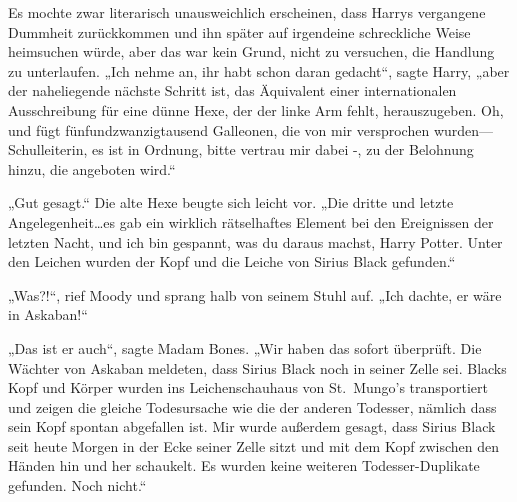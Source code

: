 Es mochte zwar literarisch unausweichlich erscheinen, dass Harrys vergangene Dummheit zurückkommen und ihn später auf irgendeine schreckliche Weise heimsuchen würde, aber das war kein Grund, nicht zu versuchen, die Handlung zu unterlaufen.
„Ich nehme an, ihr habt schon daran gedacht“, sagte Harry, „aber der naheliegende nächste Schritt ist, das Äquivalent einer internationalen Ausschreibung für eine dünne Hexe, der der linke Arm fehlt, herauszugeben. Oh, und fügt fünfundzwanzigtausend Galleonen, die von mir versprochen wurden—Schulleiterin, es ist in Ordnung, bitte vertrau mir dabei -, zu der Belohnung hinzu, die angeboten wird.“

„Gut gesagt.“
Die alte Hexe beugte sich leicht vor.
„Die dritte und letzte Angelegenheit…es gab ein wirklich rätselhaftes Element bei den Ereignissen der letzten Nacht, und ich bin gespannt, was du daraus machst, Harry Potter. Unter den Leichen wurden der Kopf und die Leiche von Sirius Black gefunden.“

„Was?!“, rief Moody und sprang halb von seinem Stuhl auf. „Ich dachte, er wäre in Askaban!“

„Das ist er auch“, sagte Madam Bones. „Wir haben das sofort überprüft. Die Wächter von Askaban meldeten, dass Sirius Black noch in seiner Zelle sei. Blacks Kopf und Körper wurden ins Leichenschauhaus von St.~Mungo’s transportiert und zeigen die gleiche Todesursache wie die der anderen Todesser, nämlich dass sein Kopf spontan abgefallen ist. Mir wurde außerdem gesagt, dass Sirius Black seit heute Morgen in der Ecke seiner Zelle sitzt und mit dem Kopf zwischen den Händen hin und her schaukelt. Es wurden keine weiteren Todesser-Duplikate gefunden. Noch nicht.“

